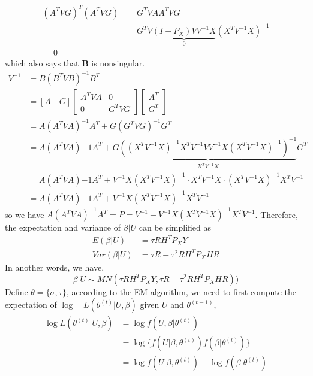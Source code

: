 \documentclass[12pt]{article}
\begin{document}
    \begin{align*}
        (A^TVG)^T(A^TVG)&=G^TVAA^TVG\\
        &=G^TV\underbrace{(I-P_X)VV^{-1}X}_{0}(X^TV^{-1}X)^{-1}\\
        =0        
    \end{align*}
    which also says that \textbf{B} is nonsingular.
    \begin{align*}
        V^{-1}&=B(B^TVB)^{-1}B^T\\
        &=[A\quad G]\begin{bmatrix}
    A^TVA&0\\
    0&G^TVG
    \end{bmatrix}\begin{bmatrix}
    A^T\\
    G^T
    \end{bmatrix}\\
    &=A(A^TVA)^{-1}A^T+G(G^TVG)^{-1}G^T\\
    &=A(A^TVA){-1}A^T+G\underbrace{((X^TV^{-1}X)^{-1}X^TV^{-1}VV^{-1}X(X^TV^{-1}X)^{-1})^{-1}}_{X^TV^{-1}X}G^T\\
    &=A(A^TVA){-1}A^T+V^{-1}X(X^TV^{-1}X)^{-1}\cdot X^TV^{-1}X\cdot (X^TV^{-1}X)^{-1}X^TV^{-1}\\
    &=A(A^TVA){-1}A^T+V^{-1}X(X^TV^{-1}X)^{-1}X^TV^{-1}
    \end{align*}
    so we have $A(A^TVA)^{-1}A^T=P=V^{-1}-V^{-1}X(X^TV^{-1}X)^{-1}X^TV^{-1}$.
    Therefore, the expectation and variance of $\beta|U$ can be simplified as
    \begin{align*}
        E(\beta|U)&=\tau RH^TP_XY\\
        Var(\beta|U)&=\tau R-\tau^2 RH^TP_XHR
    \end{align*}
    In another words, we have,
    \begin{equation*}
    \beta|U\sim MN(\tau RH^TP_XY,\tau R-\tau^2 RH^TP_XHR))
    \end{equation*}
    Define $\theta=\{\sigma, \tau\}$, according to the EM algorithm, we need to first compute the expectation of $\log\quad L(\theta^{(t)}|U,\beta)$ given $U$ and $\theta^{(t-1)}$,
    \begin{equation*}
    \begin{split}
    \log L(\theta^{(t)}|U,\beta)&=\log f(U,\beta|\theta^{(t)})\\
    &=\log\{f(U|\beta,\theta^{(t)})f(\beta|\theta^{(t)})\}\\
    &=\log f(U|\beta,\theta^{(t)})+ \log f(\beta|\theta^{(t)})
    \end{split}
    \end{equation*}
\end{document}
